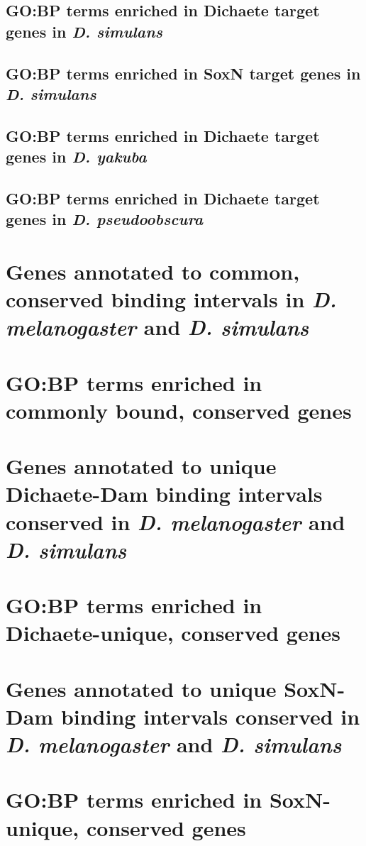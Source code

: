 \section{GO:BP terms enriched in Dichaete target genes in \emph{D. simulans}}

\section{GO:BP terms enriched in SoxN target genes in \emph{D. simulans}}

\section{GO:BP terms enriched in Dichaete target genes in \emph{D. yakuba}}

\section{GO:BP terms enriched in Dichaete target genes in \emph{D. pseudoobscura}}


\chapter{Genes annotated to common, conserved binding intervals in \emph{D. melanogaster} and \emph{D. simulans}}

\chapter{GO:BP terms enriched in commonly bound, conserved genes}

\chapter{Genes annotated to unique Dichaete-Dam binding intervals conserved in \emph{D. melanogaster} and \emph{D. simulans}}

\chapter{GO:BP terms enriched in Dichaete-unique, conserved genes} 

\chapter{Genes annotated to unique SoxN-Dam binding intervals conserved in \emph{D. melanogaster} and \emph{D. simulans}}

\chapter{GO:BP terms enriched in SoxN-unique, conserved genes}






